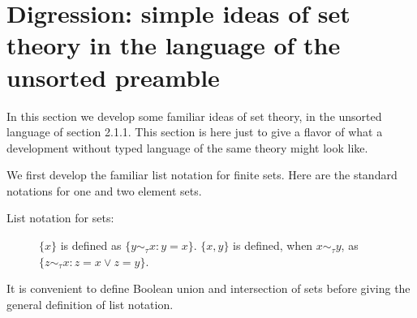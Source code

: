 \documentclass[12pt]{book}
\begin{document}
\begin{comment}
The subsequent text was written with strict types assumed but with type assignments left unspecified.   Any references to ``type {\bf k}" can be read as references
to $\tau^{\bf k+1}(u)$, where $u$ is an object of the type currently viewed as featureless individuals.  If the reader prefers, they can interpret type {\bf 0} as an actual base type.
But notice that our theory in type-free language actually does not prove that there is a base type at all!

A further subtle point is that defined constants may appear with more than one deducible type in the same formula;  with care we can read these sensibly.  $V$ for example
stands for $\{x \mid x=x\}$.  The statement $V \in V$, read $\{x \mid x=x\} \in \{y \mid y=y\}$, is {\em true\/} under the typed variable convention, as the types deduced for the two instances of $V$ are different.  $V \in V$ is true, but it is not a substitution  instance of $x \in x$, which is always a false statement;  the identity of the two occurrences of $V$ is a sort of pun.
It can be clarified as $V_x \in V_{\{x\}}$, which is indeed true.

\newpage

\end{comment}

\section{Digression:  simple ideas of set theory in the language of the unsorted preamble}

In this section we develop some familiar ideas of set theory, in the unsorted language of section 2.1.1.  This section is here just to give a flavor of what a development without typed language of the same theory might look like.

We first develop the familiar list notation for finite sets.  Here are
the standard notations for one and two element sets.

\begin{description}

\item[List notation for sets:]  $\{x\}$ is defined as $\{y \sim_\tau x:  y=x\}$.
$\{x,y\}$ is defined, when $x \sim_\tau y$, as $\{z\sim_\tau x:  z=x\vee z=y\}$.

\end{description}

It is convenient to define Boolean union and intersection of sets
before giving the general definition of list notation.
\end{document}
